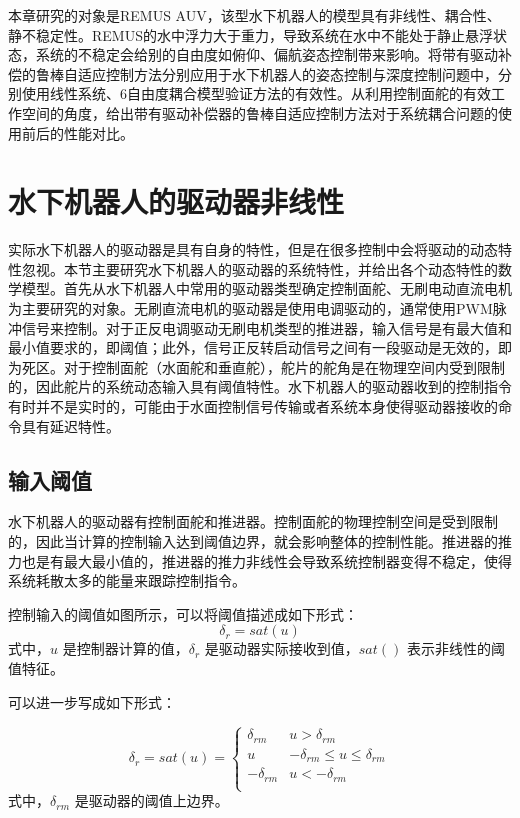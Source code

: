 本章研究的对象是REMUS AUV，该型水下机器人的模型具有非线性、耦合性、静不稳定性。REMUS的水中浮力大于重力，导致系统在水中不能处于静止悬浮状态，系统的不稳定会给别的自由度如俯仰、偏航姿态控制带来影响。将带有驱动补偿的鲁棒自适应控制方法分别应用于水下机器人的姿态控制与深度控制问题中，分别使用线性系统、6自由度耦合模型验证方法的有效性。从利用控制面舵的有效工作空间的角度，给出带有驱动补偿器的鲁棒自适应控制方法对于系统耦合问题的使用前后的性能对比。




\section{水下机器人的驱动器非线性 }

实际水下机器人的驱动器是具有自身的特性，但是在很多控制中会将驱动的动态特性忽视。本节主要研究水下机器人的驱动器的系统特性，并给出各个动态特性的数学模型。首先从水下机器人中常用的驱动器类型确定控制面舵、无刷电动直流电机为主要研究的对象。无刷直流电机的驱动器是使用电调驱动的，通常使用PWM脉冲信号来控制。对于正反电调驱动无刷电机类型的推进器，输入信号是有最大值和最小值要求的，即阈值；此外，信号正反转启动信号之间有一段驱动是无效的，即为死区。对于控制面舵（水面舵和垂直舵），舵片的舵角是在物理空间内受到限制的，因此舵片的系统动态输入具有阈值特性。水下机器人的驱动器收到的控制指令有时并不是实时的，可能由于水面控制信号传输或者系统本身使得驱动器接收的命令具有延迟特性。

\subsection{输入阈值 }

水下机器人的驱动器有控制面舵和推进器。控制面舵的物理控制空间是受到限制的，因此当计算的控制输入达到阈值边界，就会影响整体的控制性能。推进器的推力也是有最大最小值的，推进器的推力非线性会导致系统控制器变得不稳定，使得系统耗散太多的能量来跟踪控制指令。

控制输入的阈值如图所示，可以将阈值描述成如下形式：
\begin{equation}
\label{eq:chap6:sat}
\delta_r=sat(u)
\end{equation}
式中，$u$ 是控制器计算的值，$\delta_r$ 是驱动器实际接收到值，$sat()$ 表示非线性的阈值特征。

可以进一步写成如下形式：

\begin{equation}
\label{eq:chap6:sat}
\delta_r=sat(u)=
\left\{
\begin{matrix}
  \delta_{rm} & u > \delta_{rm}\\
   u & -\delta_{rm} \leq u \leq \delta_{rm}\\
   -\delta_{rm} & u < -\delta_{rm} \\
\end{matrix}\right.
\end{equation}
式中，$\delta_{rm}$ 是驱动器的阈值上边界。

